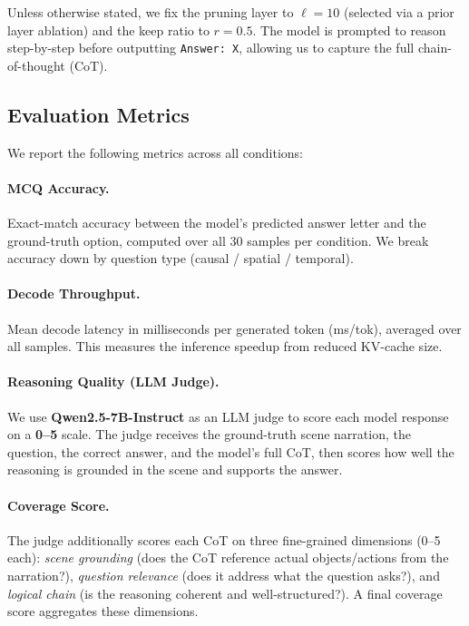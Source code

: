 Unless otherwise stated, we fix the pruning layer to $\ell = 10$
(selected via a prior layer ablation) and the keep ratio to $r = 0.5$.
The model is prompted to reason step-by-step before outputting
\texttt{Answer: X}, allowing us to capture the full chain-of-thought (CoT).

\subsection{Evaluation Metrics}

We report the following metrics across all conditions:

\paragraph{MCQ Accuracy.}
Exact-match accuracy between the model's predicted answer letter and the
ground-truth option, computed over all 30 samples per condition.
We break accuracy down by question type (causal / spatial / temporal).

\paragraph{Decode Throughput.}
Mean decode latency in milliseconds per generated token (ms/tok),
averaged over all samples. This measures the inference speedup from
reduced KV-cache size.

\paragraph{Reasoning Quality (LLM Judge).}
We use \textbf{Qwen2.5-7B-Instruct} as an LLM judge to score each model
response on a \textbf{0--5} scale.
The judge receives the ground-truth scene narration, the question,
the correct answer, and the model's full CoT, then scores how well the
reasoning is grounded in the scene and supports the answer.

\paragraph{Coverage Score.}
The judge additionally scores each CoT on three fine-grained dimensions
(0--5 each):
\emph{scene grounding} (does the CoT reference actual objects/actions
from the narration?),
\emph{question relevance} (does it address what the question asks?),
and \emph{logical chain} (is the reasoning coherent and well-structured?).
A final coverage score aggregates these dimensions.


